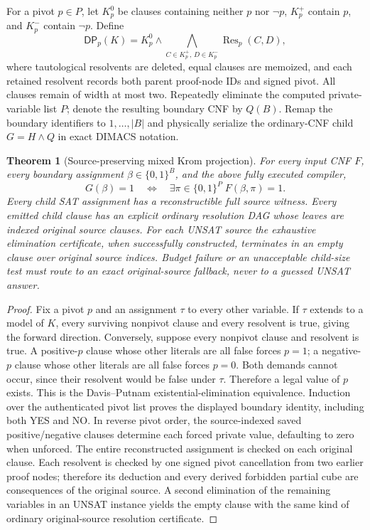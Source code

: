 \documentclass[11pt]{article}
\newtheorem{theorem}{Theorem}
\begin{document}
For a pivot $p\in P$, let $K^0_p$ be clauses containing neither $p$ nor $\neg p$, $K^+_p$ contain $p$, and $K^-_p$ contain $\neg p$. Define
\[
\mathsf{DP}_p(K)=K^0_p\land\bigwedge_{C\in K^+_p,\,D\in K^-_p}
\operatorname{Res}_p(C,D),
\]
where tautological resolvents are deleted, equal clauses are memoized, and each retained resolvent records both parent proof-node IDs and signed pivot. All clauses remain of width at most two. Repeatedly eliminate the computed private-variable list $P$; denote the resulting boundary CNF by $Q(B)$. Remap the boundary identifiers to $1,\ldots,|B|$ and physically serialize the ordinary-CNF child $G=H\land Q$ in exact DIMACS notation.

\begin{theorem}[Source-preserving mixed Krom projection]
For every input CNF $F$, every boundary assignment $\beta\in\{0,1\}^{B}$, and the above fully executed compiler,
\[
 G(\beta)=1\quad\Longleftrightarrow\quad
 \exists\pi\in\{0,1\}^{P}\;F(\beta,\pi)=1.
\]
Every child SAT assignment has a reconstructible full source witness. Every emitted child clause has an explicit ordinary resolution DAG whose leaves are indexed original source clauses. For each UNSAT source the exhaustive elimination certificate, when successfully constructed, terminates in an empty clause over original source indices. Budget failure or an unacceptable child-size test must route to an exact original-source fallback, never to a guessed UNSAT answer.
\end{theorem}
\begin{proof}
Fix a pivot $p$ and an assignment $\tau$ to every other variable. If $\tau$ extends to a model of $K$, every surviving nonpivot clause and every resolvent is true, giving the forward direction. Conversely, suppose every nonpivot clause and resolvent is true. A positive-$p$ clause whose other literals are all false forces $p=1$; a negative-$p$ clause whose other literals are all false forces $p=0$. Both demands cannot occur, since their resolvent would be false under $\tau$. Therefore a legal value of $p$ exists. This is the Davis--Putnam existential-elimination equivalence. Induction over the authenticated pivot list proves the displayed boundary identity, including both YES and NO. In reverse pivot order, the source-indexed saved positive/negative clauses determine each forced private value, defaulting to zero when unforced. The entire reconstructed assignment is checked on each original clause. Each resolvent is checked by one signed pivot cancellation from two earlier proof nodes; therefore its deduction and every derived forbidden partial cube are consequences of the original source. A second elimination of the remaining variables in an UNSAT instance yields the empty clause with the same kind of ordinary original-source resolution certificate. \qedhere
\end{proof}
\end{document}
